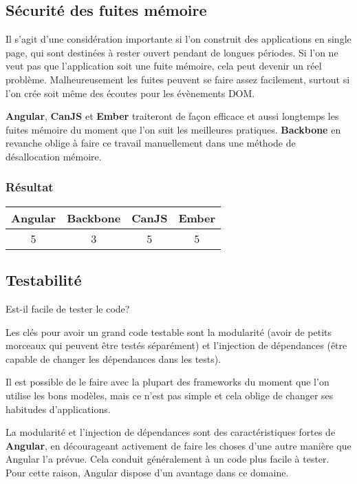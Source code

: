 \subsection{Sécurité des fuites mémoire}

Il s’agit d’une considération importante si l’on construit des applications en single page, qui sont destinées à rester ouvert pendant de longues périodes. Si l’on ne veut pas que l’application soit une fuite mémoire, cela peut devenir un réel problème. Malheureusement les fuites peuvent se faire assez facilement, surtout si l’on crée soit même des écoutes pour les évènements DOM.

\textbf{Angular}, \textbf{CanJS} et \textbf{Ember} traiteront de façon efficace et aussi longtemps les fuites mémoire du moment que l’on suit les meilleures pratiques. \textbf{Backbone} en revanche oblige à faire ce travail manuellement dans une méthode de désallocation mémoire.



\subsubsection{Résultat}
\begin{tabular}{|c|c|c|c|}
  \hline 
  Angular & Backbone & CanJS & Ember \\
  \hline 
  5 & 3 & 5 & 5 \\
  \hline
\end{tabular}


\subsection{Testabilité}

Est-il facile de tester le code?

Les clés pour avoir un grand code testable sont la modularité (avoir de petits morceaux qui peuvent être testés séparément) et l’injection de dépendances (être capable de changer les dépendances dans les tests).

Il est possible de le faire avec la plupart des frameworks du moment que l’on utilise les bons modèles, mais ce n’est pas simple et cela oblige de changer ses habitudes d’applications.

La modularité et l’injection de dépendances sont des caractéristiques fortes de \textbf{Angular}, en décourageant activement de faire les choses d’une autre manière que Angular l'a prévue. Cela conduit généralement à un code plus facile à tester. Pour cette raison, Angular dispose d'un avantage dans ce domaine.


